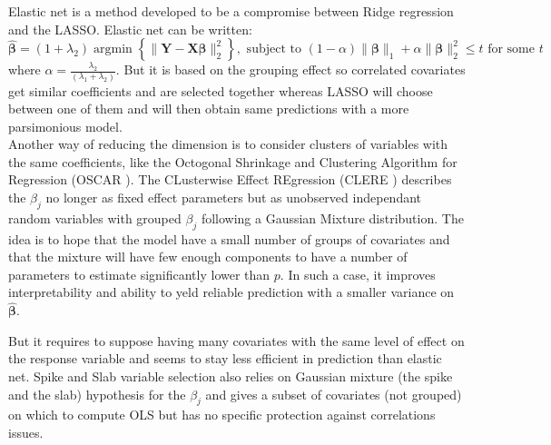 \documentclass[11pt,a4paper]{article}
\begin{document}
	Elastic net\cite{zou2005regularization}	is a method developed to be a compromise between Ridge regression and the \textsc{LASSO}. 
	Elastic net can be written:
	\begin{equation}
		\boldsymbol{\hat{\beta}}=(1+\lambda_2) \operatorname{argmin}\left\lbrace \parallel \boldsymbol{Y}-\boldsymbol{X\beta} \parallel_2^2 \right\rbrace, \textrm{ subject to } (1-\alpha)\parallel\boldsymbol{\beta}\parallel_1+\alpha\parallel\boldsymbol{\beta}\parallel_2^2\leq t \textrm{ for some } t
	\end{equation}
	where $\alpha=\frac{\lambda_2}{(\lambda_1+\lambda_2)}$. 
	But it is based on the grouping effect so correlated covariates get similar coefficients and are selected together whereas LASSO will choose between one of them and will then obtain same predictions with a more parsimonious model.
	\\
	
	Another way of reducing the dimension is to consider clusters of variables with the same coefficients, like the Octogonal Shrinkage and Clustering Algorithm for Regression (\textsc{OSCAR} \cite{bondell2008simultaneous}).
	The CLusterwise Effect REgression (\textsc{CLERE} \cite{yengo2012variable}) describes the $\beta_j$ no longer as fixed effect parameters but as unobserved independant random variables with grouped $\beta_j$ following a Gaussian Mixture distribution. The idea is to hope that the model have a small number of groups of covariates and that the mixture will have few enough components to have a number of parameters to estimate significantly lower than $p$. In such a case, it improves interpretability and ability to yeld reliable prediction with a smaller variance on $\boldsymbol{\hat{\beta}}$. 
	
	But it requires to suppose having many covariates with the same level of effect on the response variable and seems to stay less efficient in prediction than elastic net. Spike and Slab variable selection \cite{ishwaran2005spike} also relies on Gaussian mixture (the spike and the slab) hypothesis for the $\beta_j$ and gives a subset of covariates (not grouped) on which to compute \textsc{OLS} but has no specific protection against correlations issues.
	~\\	~\\
\end{document}
